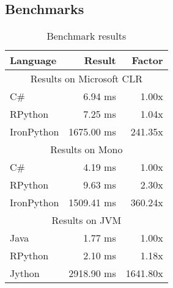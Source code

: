 
\subsection{Benchmarks}

\begin{table}[ht]
  \begin{tabular}{|l|r|r|}
    \hline
    \textbf{Language} & 
    \textbf{Result} &
    \textbf{Factor} \\
    \hline
    \multicolumn{3}{|c|}{Results on Microsoft CLR}\\
    \hline
    C\# & 
    6.94 ms &
    1.00x \\

    RPython &
    7.25 ms &
    1.04x \\

    IronPython &
    1675.00 ms &
    241.35x \\
    \hline

    \multicolumn{3}{|c|}{Results on Mono}\\
    \hline
    C\# & 
    4.19 ms &
    1.00x \\

    RPython &
    9.63 ms &
    2.30x \\

    IronPython &
    1509.41 ms &
    360.24x \\
    \hline

    \multicolumn{3}{|c|}{Results on JVM}\\
    \hline
    Java & 
    1.77 ms &
    1.00x \\

    RPython &
    2.10 ms &
    1.18x \\

    Jython &
    2918.90 ms &
    1641.80x \\
    \hline
  \end{tabular}
  \caption{Benchmark results}
  \label{table}
\end{table}
